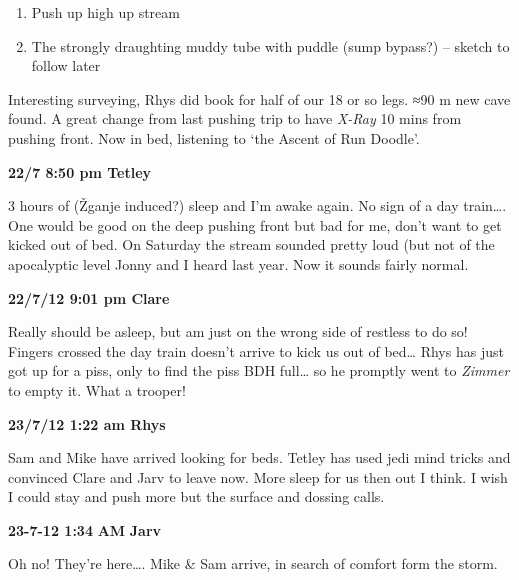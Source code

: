 \begin{enumerate}
\def\labelenumi{\arabic{enumi}.}
\tightlist
\item
  Push up high up stream
\item
  The strongly draughting muddy tube with puddle (sump bypass?) --
  sketch to follow later
\end{enumerate}

Interesting surveying, Rhys did book for half of our 18 or so legs. ≈90
m new cave found. A great change from last pushing trip to have
\emph{X-Ray} 10 mins from pushing front. Now in bed, listening to `the
Ascent of Run Doodle'.

\textbf{22/7 8:50 pm Tetley}

3 hours of (Žganje induced?) sleep and I'm awake again. No sign of a day
train\ldots{}. One would be good on the deep pushing front but bad for
me, don't want to get kicked out of bed. On Saturday the stream sounded
pretty loud (but not of the apocalyptic level Jonny and I heard last
year. Now it sounds fairly normal.

\textbf{22/7/12 9:01 pm Clare}

Really should be asleep, but am just on the wrong side of restless to do
so! Fingers crossed the day train doesn't arrive to kick us out of
bed\ldots{} Rhys has just got up for a piss, only to find the piss BDH
full\ldots{} so he promptly went to \emph{Zimmer} to empty it. What a
trooper!

\textbf{23/7/12 1:22 am Rhys}

Sam and Mike have arrived looking for beds. Tetley has used jedi mind
tricks and convinced Clare and Jarv to leave now. More sleep for us then
out I think. I wish I could stay and push more but the surface and
dossing calls.

\textbf{23-7-12 1:34} \textbf{AM} \textbf{Jarv}

Oh no! They're here\ldots{}. Mike \& Sam arrive, in search of comfort
form the storm.


